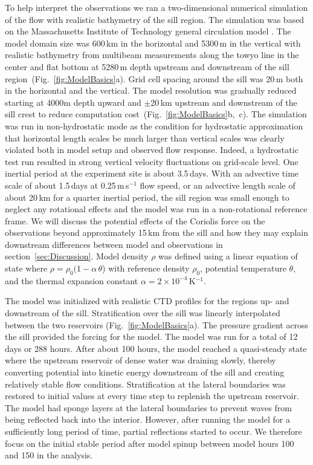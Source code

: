 \documentclass{ametsocV6.1}
\begin{document}
To help interpret the observations we ran a two-dimensional numerical simulation of the flow with realistic bathymetry of the sill region.
The simulation was based on the Massachusetts Institute of Technology general circulation model \citep[MITgcm;][]{marshalletal97}.
The model domain size was 600\,km in the horizontal and 5300\,m in the vertical with realistic bathymetry from multibeam measurements along the towyo line in the center and flat bottom at 5280\,m depth upstream and downstream of the sill region~(Fig.~\ref{fig:ModelBasics}a).
Grid cell spacing around the sill was 20\,m both in the horizontal and the vertical.
The model resolution was gradually reduced starting at 4000m depth upward and $\pm$20\,km upstream and downstream of the sill crest to reduce computation cost~(Fig.~\ref{fig:ModelBasics}b,~c).
The simulation was run in non-hydrostatic mode as the condition for hydrostatic approximation that horizontal length scales be much larger than vertical scales was clearly violated both in model setup and observed flow response.
Indeed, a hydrostatic test run resulted in strong vertical velocity fluctuations on grid-scale level.
One inertial period at the experiment site is about 3.5\,days.
With an advective time scale of about 1.5\,days at 0.25\,m\,s$^{-1}$ flow speed, or an advective length scale of about 20\,km for a quarter inertial period, the sill region was small enough to neglect any rotational effects and the model was run in a non-rotational reference frame.
We will discuss the potential effects of the Coriolis force on the observations beyond approximately 15\,km from the sill and how they may explain downstream differences between model and observations in section~\ref{sec:Discussion}.
Model density $\rho$ was defined using a linear equation of state where $\rho = \rho_0 (1 - \alpha\, \theta$) with reference density $\rho_0$, potential temperature $\theta$, and the thermal expansion constant $\alpha = 2 \times 10^{-4}$\,K$^{-1}$.

The model was initialized with realistic CTD profiles for the regions up- and downstream of the sill.
Stratification over the sill was linearly interpolated between the two reservoirs (Fig.~\ref{fig:ModelBasics}a).
The pressure gradient across the sill provided the forcing for the model.
The model was run for a total of 12 days or 288 hours.
After about 100 hours, the model reached a quasi-steady state where the upstream reservoir of dense water was draining slowly, thereby converting potential into kinetic energy downstream of the sill and creating relatively stable flow conditions.
Stratification at the lateral boundaries was restored to initial values at every time step to replenish the upstream reservoir.
The model had sponge layers at the lateral boundaries to prevent waves from being reflected back into the interior.
However, after running the model for a sufficiently long period of time, partial reflections started to occur.
We therefore focus on the initial stable period after model spinup between model hours 100 and 150 in the analysis.  
\end{document}
